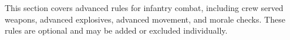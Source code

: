 This section covers advanced rules for infantry combat, including crew served weapons, advanced explosives, advanced movement, and morale checks.
These rules are optional and may be added or excluded individually.

